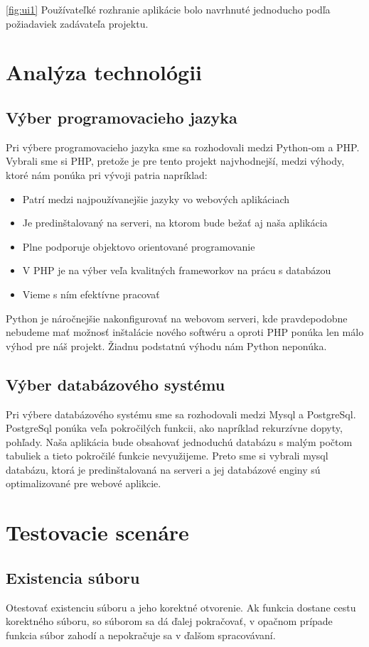 \documentclass[12pt,a4paper]{article}
\begin{document}
\ref{fig:ui1}
Používateľké rozhranie aplikácie bolo navrhnuté jednoducho podľa požiadaviek zadávateľa projektu.

\section{Analýza technológii}
\subsection{Výber programovacieho jazyka}
Pri výbere programovacieho jazyka sme sa rozhodovali medzi Python-om a PHP. 
Vybrali sme si PHP, pretože je pre tento projekt najvhodnejší, medzi výhody, ktoré nám ponúka pri vývoji patria napríklad:
\begin{itemize}
	\item Patrí medzi najpoužívanejšie jazyky vo webových aplikáciach
	\item Je predinštalovaný na serveri, na ktorom bude bežať aj naša aplikácia
	\item Plne podporuje objektovo orientované programovanie
	\item V PHP je na výber veľa kvalitných frameworkov na prácu s databázou
	\item Vieme s ním efektívne pracovať
\end{itemize}
Python je náročnejšie nakonfigurovať na webovom serveri, kde pravdepodobne nebudeme mať možnosť inštalácie nového softwéru a oproti PHP ponúka len málo výhod pre náš projekt. Žiadnu podstatnú výhodu nám Python neponúka.

\subsection{Výber databázového systému}
Pri výbere databázového systému sme sa rozhodovali medzi Mysql a PostgreSql. PostgreSql ponúka veľa pokročilých funkcii, ako napríklad rekurzívne dopyty, pohľady. Naša aplikácia bude obsahovať jednoduchú databázu s malým počtom tabuliek a tieto pokročilé funkcie nevyužijeme. Preto sme si vybrali mysql databázu, ktorá je predinštalovaná na serveri a jej databázové enginy sú optimalizované pre webové aplikcie.


\section{Testovacie scenáre}
\subsection{Existencia súboru}
Otestovať existenciu súboru a jeho korektné otvorenie. Ak funkcia dosta\-ne cestu korektného súboru, so súborom sa dá ďalej pokračovať, v opačnom prípade funkcia súbor zahodí a nepokračuje sa v ďalšom spracovávaní.
\end{document}

